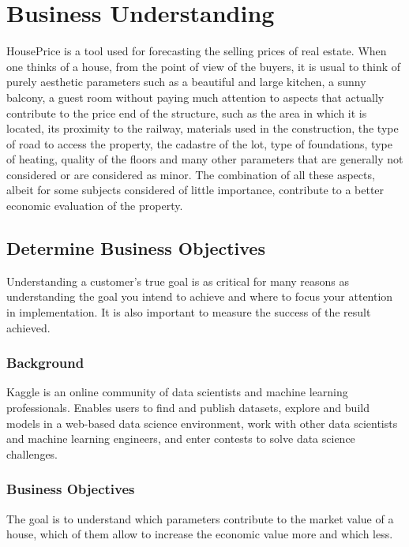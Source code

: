 \chapter{Business Understanding}

HousePrice is a tool used for forecasting the selling prices of real estate. When one thinks of a house, from the point of view of the buyers, it is usual to think of purely aesthetic parameters such as a beautiful and large kitchen, a sunny balcony, a guest room without paying much attention to aspects that actually contribute to the price end of the structure, such as the area in which it is located, its proximity to the railway, materials used in the construction, the type of road to access the property, the cadastre of the lot, type of foundations, type of heating, quality of the floors and many other parameters that are generally not considered or are considered as minor. The combination of all these aspects, albeit for some subjects considered of little importance, contribute to a better economic evaluation of the property.



\section{Determine Business Objectives}
Understanding a customer's true goal is as critical for many reasons as understanding the goal you intend to achieve and where to focus your attention in implementation. It is also important to measure the success of the result achieved.

\subsection{Background}
Kaggle is an online community of data scientists and machine learning professionals. Enables users to find and publish datasets, explore and build models in a web-based data science environment, work with other data scientists and machine learning engineers, and enter contests to solve data science challenges.

\subsection{Business Objectives}
The goal is to understand which parameters contribute to the market value of a house, which of them allow to increase the economic value more and which less.

